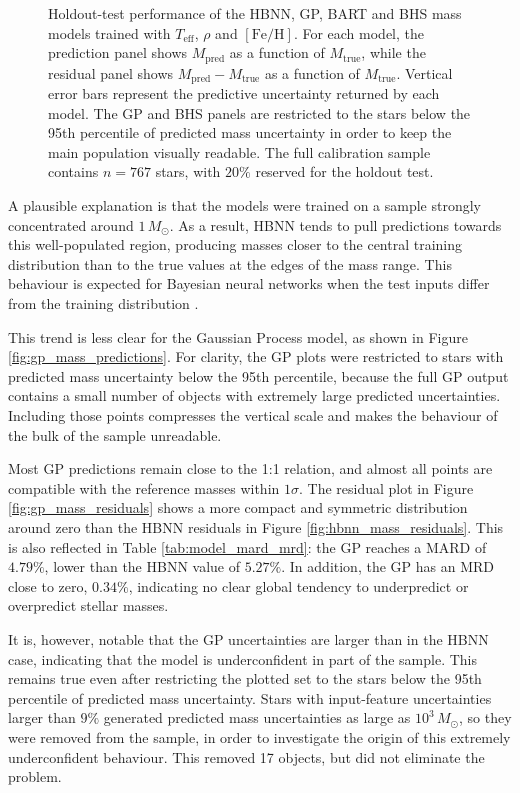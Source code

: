 \begin{figure}[H]
\caption{Holdout-test performance of the HBNN, GP, BART and BHS mass models trained with $T_{\mathrm{eff}}$, $\rho$ and $[\mathrm{Fe}/\mathrm{H}]$. For each model, the prediction panel shows $M_{\mathrm{pred}}$ as a function of $M_{\mathrm{true}}$, while the residual panel shows $M_{\mathrm{pred}}-M_{\mathrm{true}}$ as a function of $M_{\mathrm{true}}$. Vertical error bars represent the predictive uncertainty returned by each model. The GP and BHS panels are restricted to the stars below the 95th percentile of predicted mass uncertainty in order to keep the main population visually readable. The full calibration sample contains $n=767$ stars, with $20\%$ reserved for the holdout test.}
\label{fig:mass_holdout_all_models}

\end{figure}

A plausible explanation is that the models were trained on a sample strongly concentrated around $1\,M_\odot$. As a result, HBNN tends to pull predictions towards this well-populated region, producing masses closer to the central training distribution than to the true values at the edges of the mass range. This behaviour is expected for Bayesian neural networks when the test inputs differ from the training distribution \citep{izmailov2021}.

This trend is less clear for the Gaussian Process model, as shown in Figure \ref{fig:gp_mass_predictions}. For clarity, the GP plots were restricted to stars with predicted mass uncertainty below the 95th percentile, because the full GP output contains a small number of objects with extremely large predicted uncertainties. Including those points compresses the vertical scale and makes the behaviour of the bulk of the sample unreadable.

Most GP predictions remain close to the 1:1 relation, and almost all points are compatible with the reference masses within $1\sigma$. The residual plot in Figure \ref{fig:gp_mass_residuals} shows a more compact and symmetric distribution around zero than the HBNN residuals in Figure \ref{fig:hbnn_mass_residuals}. This is also reflected in Table \ref{tab:model_mard_mrd}: the GP reaches a MARD of $4.79\%$, lower than the HBNN value of $5.27\%$. In addition, the GP has an MRD close to zero, $0.34\%$, indicating no clear global tendency to underpredict or overpredict stellar masses.


It is, however, notable that the GP uncertainties are larger than in the HBNN case, indicating that the model is underconfident in part of the sample. This remains true even after restricting the plotted set to the stars below the 95th percentile of predicted mass uncertainty. Stars with input-feature uncertainties larger than $9\%$ generated predicted mass uncertainties as large as $10^3\,M_\odot$, so they were removed from the sample, in order to investigate the origin of this extremely underconfident behaviour. This removed 17 objects, but did not eliminate the problem. 

